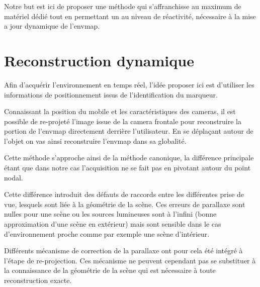 \documentclass[10pt,a4paper,twoside, twocolumn]{report}
\newcommand*{\rootPath}{../}
\begin{document}
Notre but est ici de proposer une méthode qui s’affranchisse au maximum de matériel dédié tout en permettant un au niveau de réactivité, nécessaire à la mise a jour dynamique de l’envmap.


\section{Reconstruction dynamique}

Afin d’acquérir l’environnement en temps réel, l’idée proposer ici est d'utiliser les informations de positionnement issus de l’identification du marqueur.

Connaissant la position du mobile et les caractéristiques des cameras, il est possible de re-projeté l'image issue de la camera frontale pour reconstruire la portion de l'envmap directement derrière l'utilisateur. En se déplaçant autour de l'objet on vas ainsi reconstruire l'envmap dans sa globalité.

Cette méthode s'approche ainsi de la méthode canonique, la différence principale étant que dans notre cas l'acquisition ne se fait pas en pivotant autour du point nodal.

Cette différence introduit des défauts de raccords entre les différentes prise de vue, lesquels sont liée à la géométrie de la scène. Ces erreurs de parallaxe sont nulles pour une scène ou les sources lumineuses sont à l'infini (bonne approximation d'une scène en extérieur) mais sont sensible dans le cas d'environnement proche comme par exemple une scène d'intérieur.

Différents mécanisme de correction de la parallaxe ont pour cela été intégré à l'étape de re-projection. Ces mécanisme ne peuvent cependant pas se substituer à la connaissance de la géométrie de la scène qui est nécessaire à toute reconstruction exacte.


\ifstandalone
	
	
\fi
\end{document}
